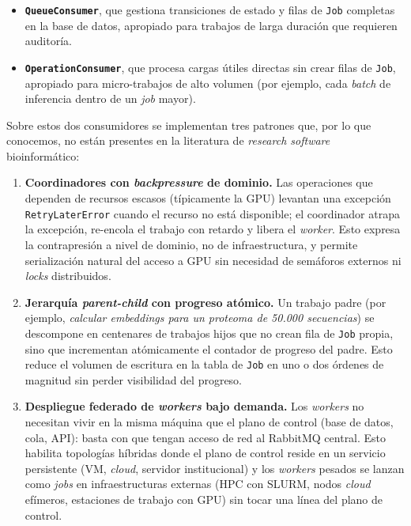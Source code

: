 \documentclass[11pt,a4paper]{article}
\begin{document}
\begin{itemize}[leftmargin=1.5em]
  \item \textbf{\texttt{QueueConsumer}}, que gestiona transiciones de estado y
    filas de \texttt{Job} completas en la base de datos, apropiado para
    trabajos de larga duración que requieren auditoría.
  \item \textbf{\texttt{OperationConsumer}}, que procesa cargas útiles directas
    sin crear filas de \texttt{Job}, apropiado para micro-trabajos de alto
    volumen (por ejemplo, cada \emph{batch} de inferencia dentro de un
    \emph{job} mayor).
\end{itemize}

Sobre estos dos consumidores se implementan tres patrones que, por lo que
conocemos, no están presentes en la literatura de \emph{research software}
bioinformático:

\begin{enumerate}[leftmargin=1.5em]
  \item \textbf{Coordinadores con \emph{backpressure} de dominio.} Las
    operaciones que dependen de recursos escasos (típicamente la GPU) levantan
    una excepción \texttt{RetryLaterError} cuando el recurso no está
    disponible; el coordinador atrapa la excepción, re-encola el trabajo con
    retardo y libera el \emph{worker}. Esto expresa la contrapresión a nivel
    de dominio, no de infraestructura, y permite serialización natural del
    acceso a GPU sin necesidad de semáforos externos ni \emph{locks}
    distribuidos.
  \item \textbf{Jerarquía \emph{parent-child} con progreso atómico.} Un trabajo
    padre (por ejemplo, \emph{calcular embeddings para un proteoma de 50{.}000
    secuencias}) se descompone en centenares de trabajos hijos que no crean
    fila de \texttt{Job} propia, sino que incrementan atómicamente el contador
    de progreso del padre. Esto reduce el volumen de escritura en la tabla de
    \texttt{Job} en uno o dos órdenes de magnitud sin perder visibilidad del
    progreso.
  \item \textbf{Despliegue federado de \emph{workers} bajo demanda.} Los
    \emph{workers} no necesitan vivir en la misma máquina que el plano de
    control (base de datos, cola, API): basta con que tengan acceso de red al
    RabbitMQ central. Esto habilita topologías híbridas donde el plano de
    control reside en un servicio persistente (VM, \emph{cloud}, servidor
    institucional) y los \emph{workers} pesados se lanzan como \emph{jobs} en
    infraestructuras externas (HPC con SLURM, nodos \emph{cloud} efímeros,
    estaciones de trabajo con GPU) sin tocar una línea del plano de control.
\end{enumerate}
\end{document}
